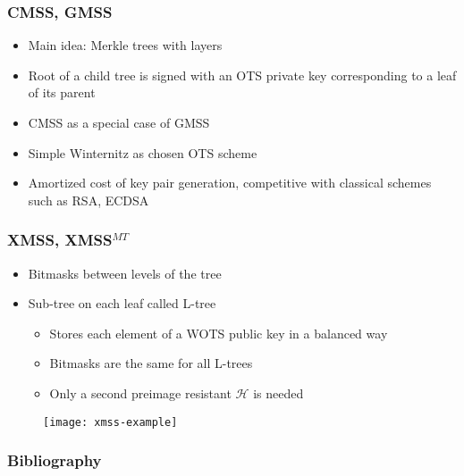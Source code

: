 \documentclass[12pt]{beamer}
\newcommand{\hh}{$\mathcal{H}$}
\begin{document}
\begin{frame}
  \frametitle{CMSS, GMSS}
  \begin{itemize}
    \item Main idea: Merkle trees with layers
    \item Root of a child tree is signed with an OTS private key
      corresponding to a leaf of its parent
    \item CMSS as a special case of GMSS
    \item Simple Winternitz as chosen OTS scheme
    \item Amortized cost of key pair generation,
      competitive with classical schemes such as RSA, ECDSA
  \end{itemize}
\end{frame}

\begin{frame}
  \frametitle{XMSS, XMSS$^{MT}$}
  \begin{itemize}
    \item Bitmasks between levels of the tree
    \item Sub-tree on each leaf called L-tree
    \begin{itemize}
      \item Stores each element of a WOTS public key in a balanced way
      \item Bitmasks are the same for all L-trees
      \item Only a second preimage resistant \hh{} is needed
    \end{itemize}
  \end{itemize}
  \begin{figure}[htbp]
    \centering
    \texttt{[image: xmss-example]}
  \end{figure}
\end{frame}

\begin{frame}
  \frametitle{Bibliography}
  
  
\end{frame}
\end{document}
